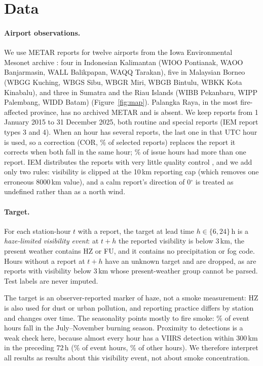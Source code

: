 \section{Data}
\label{sec:data}

\paragraph{Airport observations.}
We use METAR reports for twelve airports from the Iowa Environmental Mesonet archive \citep{iem}:
four in Indonesian Kalimantan (WIOO Pontianak, WAOO Banjarmasin, WALL Balikpapan, WAQQ Tarakan),
five in Malaysian Borneo (WBGG Kuching, WBGS Sibu, WBGR Miri, WBGB Bintulu, WBKK Kota Kinabalu),
and three in Sumatra and the Riau Islands (WIBB Pekanbaru, WIPP Palembang, WIDD Batam)
(Figure~\ref{fig:map}). Palangka Raya, in the most fire-affected province, has no archived METAR
and is absent. We keep reports from 1 January 2015 to 31 December 2025, both routine and special
reports (IEM report types 3 and 4). When an hour has several reports, the last one in that UTC hour
is used, so a correction (COR, \% of selected reports) replaces the report it
corrects when both fall in the same hour; \% of issue hours had more than one
report. IEM distributes the reports with very little quality control \citep{iem}, and we add only
two rules: visibility is clipped at the 10\,km reporting cap (which removes one erroneous
8000\,km value), and a calm report's direction of 0$^\circ$ is treated as undefined rather than
as a north wind.

\paragraph{Target.}
For each station-hour $t$ with a report, the target at lead time $h\in\{6,24\}$\,h is a
\emph{haze-limited visibility event}: at $t+h$ the reported visibility is below 3\,km, the present
weather contains HZ or FU, and it contains no precipitation or fog code. Hours without a report at
$t+h$ have an unknown target and are dropped, as are reports with visibility below 3\,km whose
present-weather group cannot be parsed. Test labels are never imputed.

The target is an observer-reported marker of haze, not a smoke measurement: HZ is also used for
dust or urban pollution, and reporting practice differs by station and changes over time. The
seasonality points mostly to fire smoke: \% of event hours fall in
the July--November burning season. Proximity to detections is a weak check here, because almost
every hour has a VIIRS detection within 300\,km in the preceding 72\,h
(\% of event hours, \% of other hours).
We therefore interpret all results as results about this visibility event, not about smoke
concentration.

